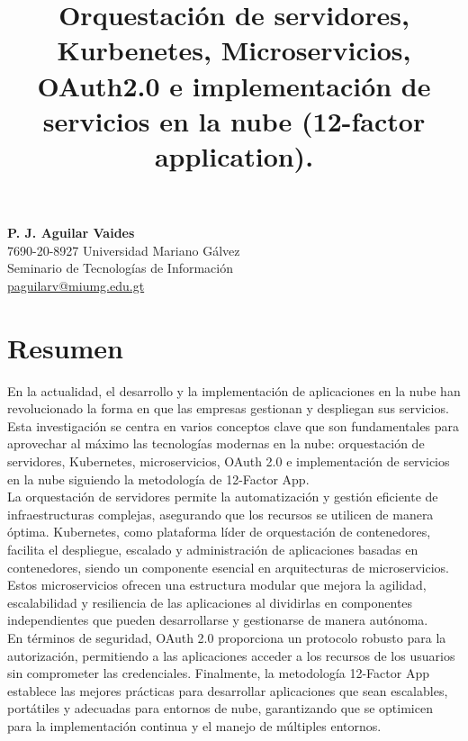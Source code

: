 \documentclass{article}
\title{\vspace{-2cm}\large\textbf{Orquestación de servidores, Kurbenetes, Microservicios, OAuth2.0 e implementación de servicios en la nube (12-factor application).}}
\author{}
\date{\vspace{-2.2cm}}
\begin{document}
\maketitle

\begin{center}
    \textbf{P. J. Aguilar Vaides} \\
    7690-20-8927 Universidad Mariano Gálvez \\
    Seminario de Tecnologías de Información \\
    \href{mailto:jperez@gmail.com}{paguilarv@miumg.edu.gt}
\end{center}

\section{Resumen}

En la actualidad, el desarrollo y la implementación de aplicaciones en la nube han revolucionado la forma en que las empresas gestionan y despliegan sus servicios. Esta investigación se centra en varios conceptos clave que son fundamentales para aprovechar al máximo las tecnologías modernas en la nube: orquestación de servidores, Kubernetes, microservicios, OAuth 2.0 e implementación de servicios en la nube siguiendo la metodología de 12-Factor App.\\

La orquestación de servidores permite la automatización y gestión eficiente de infraestructuras complejas, asegurando que los recursos se utilicen de manera óptima. Kubernetes, como plataforma líder de orquestación de contenedores, facilita el despliegue, escalado y administración de aplicaciones basadas en contenedores, siendo un componente esencial en arquitecturas de microservicios. Estos microservicios ofrecen una estructura modular que mejora la agilidad, escalabilidad y resiliencia de las aplicaciones al dividirlas en componentes independientes que pueden desarrollarse y gestionarse de manera autónoma.\\

En términos de seguridad, OAuth 2.0 proporciona un protocolo robusto para la autorización, permitiendo a las aplicaciones acceder a los recursos de los usuarios sin comprometer las credenciales. Finalmente, la metodología 12-Factor App establece las mejores prácticas para desarrollar aplicaciones que sean escalables, portátiles y adecuadas para entornos de nube, garantizando que se optimicen para la implementación continua y el manejo de múltiples entornos.\\
\end{document}
